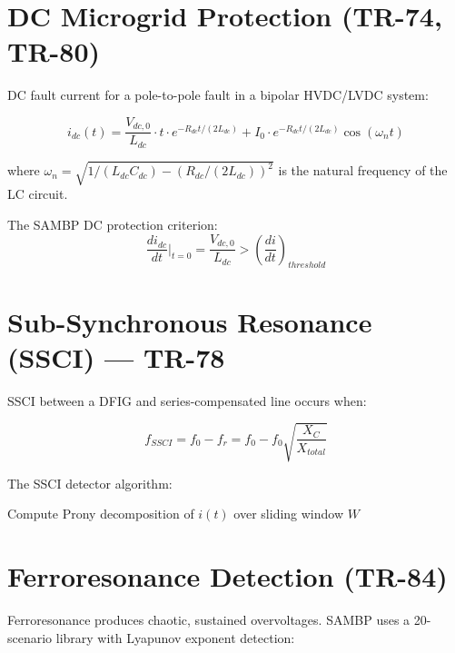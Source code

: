 \documentclass[11pt,a4paper]{report}
\begin{document}
\section{DC Microgrid Protection (TR-74, TR-80)}

DC fault current for a pole-to-pole fault in a bipolar HVDC/LVDC system:

\begin{equation}
\label{eq:dc_fault}
i_{dc}(t) = \frac{V_{dc,0}}{L_{dc}}\cdot t\cdot e^{-R_{dc}t/(2L_{dc})}
  + I_{0}\cdot e^{-R_{dc}t/(2L_{dc})}\cos\!\left(\omega_n t\right)
\end{equation}

where $\omega_n = \sqrt{1/(L_{dc}C_{dc}) - (R_{dc}/(2L_{dc}))^2}$ is the natural frequency of the LC circuit.

The SAMBP DC protection criterion:
\begin{equation}
\frac{di_{dc}}{dt}\bigg|_{t=0} = \frac{V_{dc,0}}{L_{dc}} > \left(\frac{di}{dt}\right)_{threshold}
\end{equation}

\section{Sub-Synchronous Resonance (SSCI) — TR-78}

SSCI between a DFIG and series-compensated line occurs when:

\begin{equation}
\label{eq:ssci}
f_{SSCI} = f_0 - f_r = f_0 - f_0\sqrt{\frac{X_C}{X_{total}}}
\end{equation}

The SSCI detector algorithm:

\begin{algorithm}[H]
\caption{SSCI Detector — TR-78}
\label{alg:ssci}
\BlankLine
Compute Prony decomposition of $i(t)$ over sliding window $W$\;
\end{algorithm}

\section{Ferroresonance Detection (TR-84)}

Ferroresonance produces chaotic, sustained overvoltages. SAMBP uses a 20-scenario library with Lyapunov exponent detection:
\end{document}
